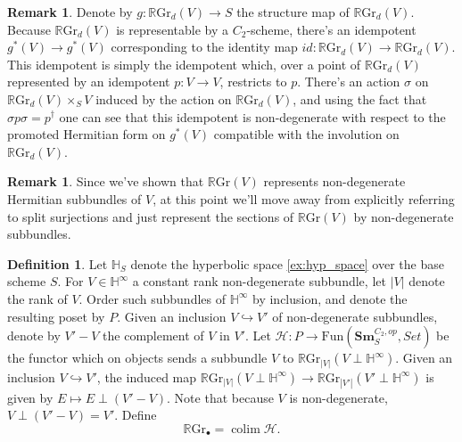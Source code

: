 \documentclass[edeposit,fullpage]{uiucthesis2009}
\newcommand{\mbb}{\mathbb}
\newcommand{\mc}{\mathcal}
\newcommand{\RGr}{\mathbb R\mathrm{Gr}}
\newcommand{\Sm}[1]{\mathbf{Sm}_{#1}}
\DeclareMathOperator*{\colim}{colim}
\theoremstyle{plain}
\numberwithin{lemma}{section}
\theoremstyle{definition}
\newtheorem{definition}[lemma]{Definition}
\newtheorem{remark}[lemma]{Remark}
\begin{document}
\begin{remark}
Denote by $g : \RGr_d(V) \rightarrow S$ the structure map of
$\RGr_d(V)$.  Because $\RGr_d(V)$ is representable by a $C_2$-scheme, there's an
idempotent $g^*(V) \rightarrow g^*(V)$ corresponding to the identity map $id: \RGr_d(V) \rightarrow
\RGr_d(V)$. This idempotent is simply the idempotent which, over a
point of $\RGr_d(V)$ represented by an idempotent $p : V \rightarrow
V$, restricts to $p$. There's an action $\sigma$ on $\RGr_d(V) \times_S V$
induced by the action on $\RGr_d(V)$, and using the fact that $\sigma
p \sigma = p^\dagger$ one can see that this idempotent is
non-degenerate with respect to the promoted Hermitian form on $g^*(V)$
compatible with the involution on $\RGr_d(V)$.
\end{remark}

\begin{remark}
Since we've shown that $\RGr(V)$ represents non-degenerate Hermitian
subbundles of $V$, at this point we'll move away from explicitly
referring to split surjections and just represent the sections of
$\RGr(V)$ by non-degenerate subbundles. 
\end{remark}

\begin{definition}
Let $\mbb H_S$ denote the hyperbolic space \ref{ex:hyp_space} over the base scheme $S$. For $V \in \mbb H^\infty$
a constant rank non-degenerate subbundle,
let $|V|$ denote the rank of $V$. Order such subbundles of $\mbb
H^\infty$ by inclusion, and denote the resulting poset by $P$. Given an inclusion $V \hookrightarrow V'$
of non-degenerate subbundles, denote by $V'-V$ the complement of $V$
in $V'$. Let $\mc H : P \rightarrow \mathrm{Fun}(\Sm{S}^{C_2,
  op},Set)$ be the functor which on objects sends a subbundle $V$ to $
\RGr_{|V|} (V \perp \mbb H^\infty)$. Given an inclusion $V \hookrightarrow V'$, the induced map
$\RGr_{|V|}(V \perp \mbb H^\infty) \rightarrow \RGr_{|V'|}(V' \perp
\mbb H^\infty)$ is given by $E \mapsto E \perp (V'-V)$. Note that
because $V$ is non-degenerate, $V \perp (V'-V) = V'$. Define
\begin{equation}\label{def:RGr_inf}
\RGr_\bullet = \colim \mc H.
\end{equation}

\end{definition}



\end{document}
